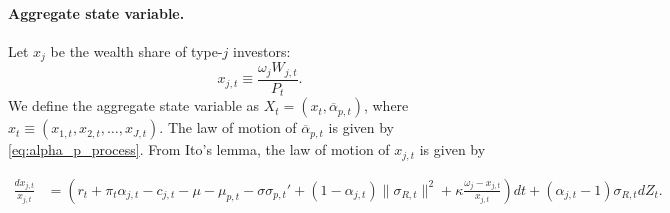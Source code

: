 \paragraph{Aggregate state variable.} Let $x_j$ be the wealth share of type-$j$ investors:
\begin{equation}
    x_{j,t} \equiv \frac{\omega_j W_{j,t}}{P_t}.\nonumber
\end{equation}
We define the aggregate state variable as $X_t = (x_t, \overline{\alpha}_{p,t})$, where $x_t \equiv \left(x_{1,t}, x_{2,t}, \ldots, x_{J,t}\right )$. The law of motion of $\overline{\alpha}_{p,t}$ is given by \eqref{eq:alpha_p_process}. 
From Ito's lemma, the law of motion of $x_{j,t}$ is given by
\begin{small}
	\begin{align*}
		\frac{d x_{j,t}}{x_{j,t}} &= \left( r_t + \pi_t \alpha_{j,t} - c_{j,t} -\mu - \mu_{p,t} - \sigma \sigma_{p,t}'  +(1- \alpha_{j,t}) \|\sigma_{R,t}\|^2  +\kappa \frac{\omega_j-x_{j,t}}{x_{j,t}}  \right) dt + \left (\alpha_{j,t} - 1\right ) \sigma_{R,t} d Z_t.
	\end{align*}
\end{small}


